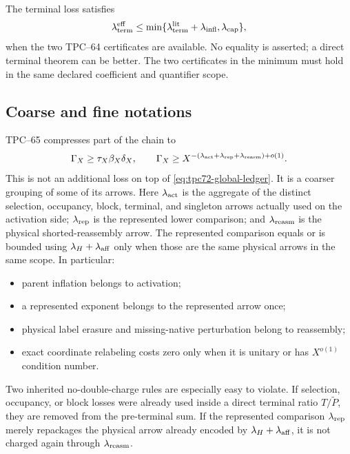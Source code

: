 The terminal loss satisfies
\begin{equation}
 \lambda_{\rm term}^{\rm eff}
 \le
 \min\{
 \lambda_{\rm term}^{\rm lit}+\lambda_{\rm infl},
 \lambda_{\rm cap}
 \},
 \label{eq:tpc72-terminal-loss}
\end{equation}
when the two TPC--64 certificates are available.  No equality is asserted;
a direct terminal theorem can be better.  The two certificates in the
minimum must hold in the same declared coefficient and quantifier scope.

\subsection{Coarse and fine notations}

TPC--65 compresses part of the chain to
\begin{equation}
 \Gamma_X\ge\tau_X\beta_X\delta_X,
 \qquad
 \Gamma_X
 \ge
 X^{-(\lambda_{\rm act}+\lambda_{\rm rep}
       +\lambda_{\rm reasm})+o(1)}.
 \label{eq:tpc72-coarse-ledger}
\end{equation}
This is not an additional loss on top of
\eqref{eq:tpc72-global-ledger}.  It is a coarser grouping of some of its
arrows.  Here \(\lambda_{\rm act}\) is the aggregate of the distinct
selection, occupancy, block, terminal, and singleton arrows actually used
on the activation side; \(\lambda_{\rm rep}\) is the represented lower
comparison; and \(\lambda_{\rm reasm}\) is the physical shorted-reassembly
arrow.  The represented comparison equals or is bounded using
\(\lambda_H+\lambda_{\rm aff}\) only when those are the same physical
arrows in the same scope.  In particular:
\begin{itemize}
 \item parent inflation belongs to activation;
 \item a represented exponent belongs to the represented arrow once;
 \item physical label erasure and missing-native perturbation belong to
       reassembly;
 \item exact coordinate relabeling costs zero only when it is unitary or
       has \(X^{o(1)}\) condition number.
\end{itemize}
Two inherited no-double-charge rules are especially easy to violate.
If selection, occupancy, or block losses were already used inside a direct
terminal ratio \(T/\widetilde P\), they are removed from the pre-terminal
sum.  If the represented comparison \(\lambda_{\rm rep}\) merely
repackages the physical arrow already encoded by
\(\lambda_H+\lambda_{\rm aff}\), it is not charged again through
\(\lambda_{\rm reasm}\).

